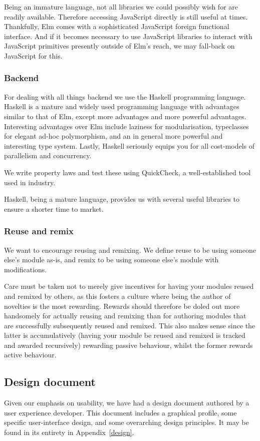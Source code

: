 Being an immature language, not all libraries we could possibly wish for are 
readily available. Therefore accessing JavaScript directly is still useful at 
times. Thankfully, Elm comes with a sophisticated JavaScript foreign 
functional interface\cite{elmports}. And if it becomes necessary to use 
JavaScript libraries to interact with JavaScript primitives presently outside 
of Elm's reach, we may fall-back on JavaScript for this.

\subsubsection{Backend}
For dealing with all things backend we use the Haskell programming 
language\cite{marlow2010haskell}. Haskell is a mature and widely used 
programming language with advantages similar to that of Elm, except more 
advantages and more powerful advantages. Interesting advantages over Elm 
include laziness for modularisation\cite{hughes1989functional}, typeclasses 
for elegant ad-hoc polymorphism\cite{wadler1989make}, and an in general more 
powerful and interesting type system\cite{jones2003wearing}. Lastly, Haskell 
seriously equips you for all cost-models of parallelism and 
concurrency\cite{jones2012future}.

We write property laws and test these using 
QuickCheck\cite{claessen2011quickcheck}, a well-established tool used in 
industry\cite{arts2006testing}.

Haskell, being a mature language, provides us with several useful libraries to 
ensure a shorter time to market.

\subsubsection{Reuse and remix}
We want to encourage reusing and remixing. We define reuse to be using someone 
else's module as-is, and remix to be using someone else's module with 
modifications.

Care must be taken not to merely give incentives for having your modules 
reused and remixed by others, as this fosters a culture where being the author 
of novelties is the most rewarding. Rewards should therefore be doled out more 
handsomely for actually reusing and remixing than for authoring modules that 
are successfully subsequently reused and remixed. This also makes sense since 
the latter is accumulatively (having your module be reused and remixed is 
tracked and awarded recursively) rewarding passive behaviour, whilst the 
former rewards active behaviour. 

\subsection{Design document}
Given our emphasis on usability, we have had a design document authored by a 
user experience developer. This document includes a graphical profile, some 
specific user-interface design, and some overarching design principles. It may 
be found in its entirety in Appendix~\ref{design}.
